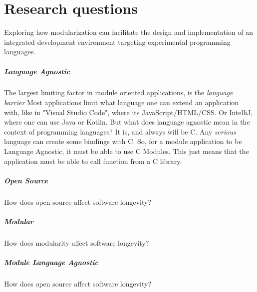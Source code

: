 \chapter{Research questions}

Exploring how modularization can facilitate the design and implementation of
an integrated development environment targeting experimental programming
languages.




\paragraph{Language Agnostic} The largest limiting factor in module oriented
applications, is the \textit{language barrier} Most applications limit what
language one can extend an application with, like in "Visual Studio Code", where
its JavaScript/HTML/CSS. Or IntelliJ, where one can use Java or Kotlin. But what
does language agnostic mean in the context of programming languages? It is, and
always will be C. Any \textit{serious} language can create some bindings with C.
So, for a module application to be Language Agnostic, it must be able to use C
Modules. This just means that the application must be able to call function from
a C library.


\paragraph{Open Source} How does open source affect software longevity?

\paragraph{Modular} How does modularity affect software longevity?

\paragraph{Module Language Agnostic} How does open source affect software
longevity?
